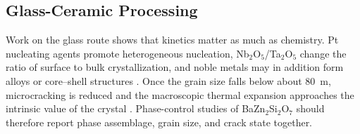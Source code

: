 \subsection{Glass-Ceramic Processing}

Work on the glass route shows that kinetics matter as much as chemistry. Pt nucleating agents promote heterogeneous nucleation, Nb$_2$O$_5$\slash Ta$_2$O$_5$ change the ratio of surface to bulk crystallization, and noble metals may in addition form alloys or core--shell structures \cite{vladislavova2017heterogeneous,heitmann2019surface,thieme2022noble,thieme2018growth}. Once the grain size falls below about 80~\textmu m, microcracking is reduced and the macroscopic thermal expansion approaches the intrinsic value of the crystal \cite{thieme2016thermal}. Phase-control studies of BaZn$_2$Si$_2$O$_7$ should therefore report phase assemblage, grain size, and crack state together.
